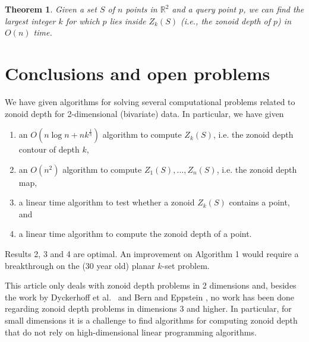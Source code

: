 \documentclass[charterfonts,lotsofwhite]{patmorin}
\newtheorem{theorem}{Theorem}
\begin{document}
\begin{theorem}\label{theorem_final}
Given a set $S$ of $n$ points in $\mathbb{R}^2$ and a query point $p$,
we can find the largest integer $k$ for which $p$ lies inside $Z_k(S)$
(i.e., the zonoid depth of $p$) in $O(n)$ time. 
\end{theorem}

\section{Conclusions and open problems}\label{section_conclusions_and_open_problems}

We have given algorithms for solving several computational problems
related to zonoid depth for 2-dimensional (bivariate) data.
In particular,  we have given 

\begin{enumerate}
\item an $O(n\log n+nk^{\frac{1}{3}})$ algorithm to compute $Z_k(S)$, i.e. the zonoid depth contour of depth $k$,	
\item an $O(n^2)$ algorithm to compute $Z_1(S),\ldots,Z_n(S)$, i.e. the zonoid depth map,
\item a linear time algorithm to test whether a zonoid $Z_k(S)$ contains a point, and
\item a linear time algorithm to compute the zonoid depth of a point.
\end{enumerate}
Results 2, 3 and 4 are optimal. An improvement on Algorithm 1 would require a breakthrough on the (30 year old) planar $k$-set problem. 

This article only deals with zonoid depth problems in 2 dimensions
and, besides the work by Dyckerhoff et al.\
\cite{zonoid_data_depth_theory_and_computation} and Bern and Eppstein
\cite{bern-eppstein-01}, no work has been done regarding zonoid depth
problems in dimensions 3 and higher.  In particular, for small
dimensions it is a challenge to find algorithms for computing zonoid
depth that do not rely on high-dimensional linear programming
algorithms.



\end{document}
